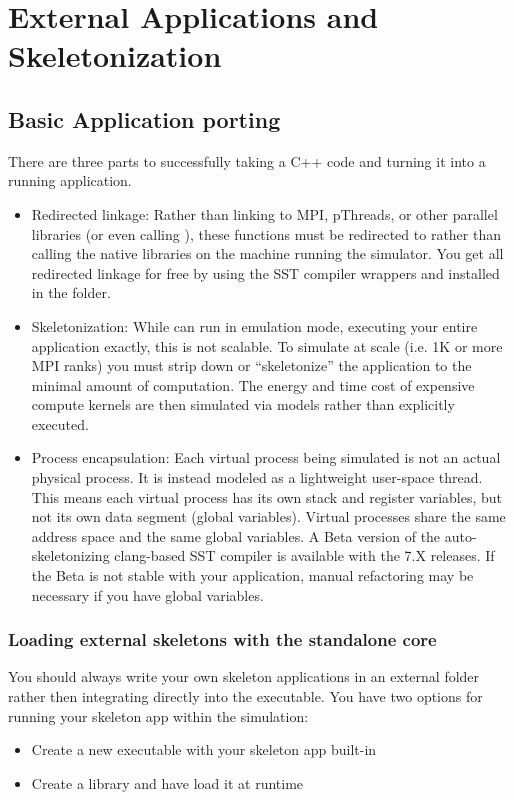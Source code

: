 
\chapter{External Applications and Skeletonization}
\label{chap:appsAndSkeletonization}

\section{Basic Application porting}
\label{sec:skel:basic}
There are three parts to successfully taking a C++ code and turning it into a running application.
\begin{itemize}
\item Redirected linkage: Rather than linking to MPI, pThreads, or other parallel libraries (or even calling ), these functions must be redirected to \sstmacro rather than calling the native libraries on the machine running the simulator.
You get all redirected linkage for free by using
the SST compiler wrappers  and  installed in the  folder.
\item Skeletonization: While \sstmacro can run in emulation mode, executing your entire application exactly, this is not scalable.  To simulate at scale (i.e. 1K or more MPI ranks) you must strip down or ``skeletonize'' the application to the minimal amount of computation.  The energy and time cost of expensive compute kernels are then simulated via models rather than explicitly executed. 

\item Process encapsulation: Each virtual process being simulated is not an actual physical process. It is instead modeled as a lightweight user-space thread.  This means each virtual process has its own stack and register variables, but not its own data segment (global variables).
Virtual processes share the same address space and the same global variables.  A Beta version of the auto-skeletonizing clang-based SST compiler is available with the 7.X releases. If the Beta is not stable with your application, manual refactoring may be necessary if you have global variables.

\end{itemize}

\subsection{Loading external skeletons with the standalone core}\label{subsec:externalAppStandalone}
You should always write your own skeleton applications in an external folder rather then integrating directly into the  executable.
You have two options for running your skeleton app within the simulation:
\begin{itemize}
\item Create a new executable with your skeleton app built-in
\item Create a library  and have  load it at runtime
\end{itemize}

